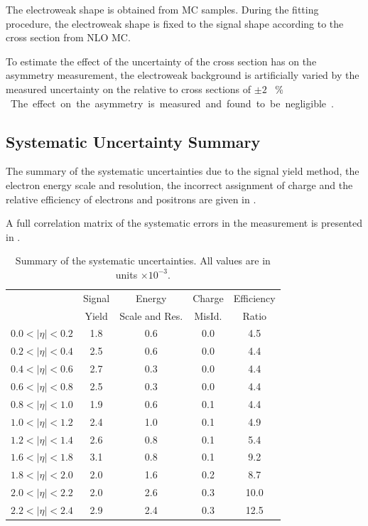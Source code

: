 The {electroweak} shape is obtained from {MC} samples. During the fitting
procedure, the {electroweak} shape is fixed to the \Wenu signal shape according to
the cross section from NLO {MC}.

To estimate the effect of the uncertainty of the cross section has on the
asymmetry measurement, the {electroweak} background is artificially varied by
the measured uncertainty on the relative \PW to \PZ cross sections of
\unit{$\pm2$}{ \% }. The effect on the asymmetry is measured and found to be
negligible \cite{bendavid2011electron}.

\subsection{Systematic Uncertainty Summary}
The summary of the systematic uncertainties due to the signal yield method, the
electron energy scale and resolution, the incorrect assignment of charge and the
relative efficiency of electrons and positrons are given in
.

A full correlation matrix of the systematic errors in the measurement is
presented in .

\begin{table}[htbp]
 \begin{center}
   \begin{tabular}{lcccc}
\midrule
      &Signal & Energy & Charge &  Efficiency \\
     & Yield & Scale and Res. & MisId. & Ratio \\ \midrule
$0.0<|\eta|<0.2$ & 1.8 & 0.6 & 0.0 &  4.5 \\
$0.2<|\eta|<0.4$ & 2.5 & 0.6 & 0.0 &  4.4 \\
$0.4<|\eta|<0.6$ & 2.7 & 0.3 & 0.0 &  4.4 \\
$0.6<|\eta|<0.8$ & 2.5 & 0.3 & 0.0 &  4.4 \\
$0.8<|\eta|<1.0$ & 1.9 & 0.6 & 0.1 &  4.4 \\
$1.0<|\eta|<1.2$ & 2.4 & 1.0 & 0.1 &  4.9 \\
$1.2<|\eta|<1.4$ & 2.6 & 0.8 & 0.1 &  5.4 \\
$1.6<|\eta|<1.8$ & 3.1 & 0.8 & 0.1 &  9.2 \\
$1.8<|\eta|<2.0$ & 2.0 & 1.6 & 0.2 &  8.7 \\
$2.0<|\eta|<2.2$ & 2.0 & 2.6 & 0.3 & 10.0 \\
$2.2<|\eta|<2.4$ & 2.9 & 2.4 & 0.3 & 12.5 \\
\bottomrule
    \end{tabular}
  \end{center}
 \caption{\label{tab:updatedsummarysyst}Summary of the systematic uncertainties.
All values are in units $\times 10^{-3}$\cite{bendavid2011electron}. }
\end{table}
                  

